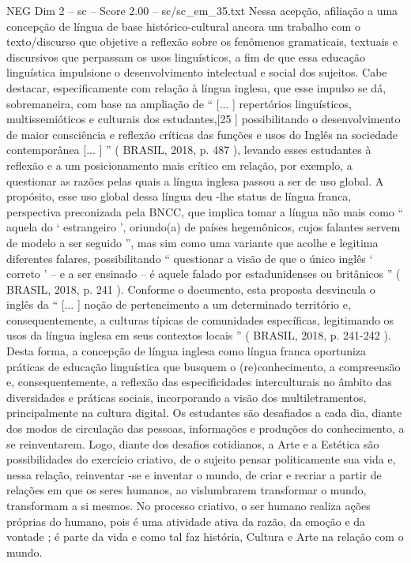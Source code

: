 \begin{textsample}{NEG Dim 2 – sc – Score 2.00 – sc/sc\_em\_35.txt}
Nessa acepção, afiliação a uma concepção de língua de base histórico-cultural ancora um trabalho com o texto/discurso que objetive a reflexão sobre os fenômenos gramaticais, textuais e discursivos que perpassam os usos linguísticos, a fim de que essa educação linguística impulsione o desenvolvimento intelectual e social dos sujeitos.
Cabe destacar, especificamente com relação à língua inglesa, que esse impulso se dá, sobremaneira, com base na ampliação de “ [... ] repertórios linguísticos, multissemióticos e culturais dos estudantes,[25 ] possibilitando o desenvolvimento de maior consciência e reflexão críticas das funções e usos do Inglês na sociedade contemporânea [... ] ” ( BRASIL, 2018, p. 487 ), levando esses estudantes à reflexão e a um posicionamento mais crítico em relação, por exemplo, a questionar as razões pelas quais a língua inglesa passou a ser de uso global.
A propósito, esse uso global dessa língua deu -lhe status de língua franca, perspectiva preconizada pela BNCC, que implica tomar a língua não mais como “ aquela do ‘ estrangeiro ’, oriundo(a) de países hegemônicos, cujos falantes servem de modelo a ser seguido ”, mas sim como uma variante que acolhe e legitima diferentes falares, possibilitando “ questionar a visão de que o único inglês ‘ correto ’ – e a ser ensinado – é aquele falado por estadunidenses ou britânicos ” ( BRASIL, 2018, p. 241 ).
Conforme o documento, esta proposta desvincula o inglês da “ [... ] noção de pertencimento a um determinado território e, consequentemente, a culturas típicas de comunidades específicas, legitimando os usos da língua inglesa em seus contextos locais ” ( BRASIL, 2018, p. 241-242 ).
Desta forma, a concepção de língua inglesa como língua franca oportuniza práticas de educação linguística que busquem o (re)conhecimento, a compreensão e, consequentemente, a reflexão das especificidades interculturais no âmbito das diversidades e práticas sociais, incorporando a visão dos multiletramentos, principalmente na cultura digital.
Os estudantes são desafiados a cada dia, diante dos modos de circulação das pessoas, informações e produções do conhecimento, a se reinventarem.
Logo, diante dos desafios cotidianos, a Arte e a Estética são possibilidades do exercício criativo, de o sujeito pensar politicamente sua vida e, nessa relação, reinventar -se e inventar o mundo, de criar e recriar a partir de relações em que os seres humanos, ao vislumbrarem transformar o mundo, transformam a si mesmos.
No processo criativo, o ser humano realiza ações próprias do humano, pois é uma atividade ativa da razão, da emoção e da vontade ; é parte da vida e como tal faz história, Cultura e Arte na relação com o mundo.

\end{textsample}
